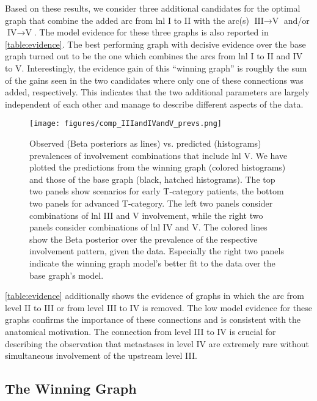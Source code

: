 \documentclass[twocolumn]{article}
\begin{document}
Based on these results, we consider three additional candidates for the optimal graph that combine the added arc from \gls{lnl} I to II with the arc(s) $\text{III} \rightarrow \text{V}$ and/or $\text{IV} \rightarrow \text{V}$. The model evidence for these three graphs is also reported in \cref{table:evidence}. The best performing graph with decisive evidence over the base graph turned out to be the one which combines the arcs from \gls{lnl} I to II and IV to V. Interestingly, the evidence gain of this ``winning graph'' is roughly the sum of the gains seen in the two candidates where only one of these connections was added, respectively. This indicates that the two additional parameters are largely independent of each other and manage to describe different aspects of the data.

\begin{figure*}
    \begin{centering}
        \texttt{[image: figures/comp\_IIIandIVandV\_prevs.png]}
        \caption{Observed (Beta posteriors as lines) vs. predicted (histograms) prevalences of involvement combinations that include \gls{lnl} V. We have plotted the predictions from the winning graph (colored histograms) and those of the base graph (black, hatched histograms). The top two panels show scenarios for early T-category patients, the bottom two panels for advanced T-category. The left two panels consider combinations of \gls{lnl} III and V involvement, while the right two panels consider combinations of \gls{lnl} IV and V. The colored lines show the Beta posterior over the prevalence of the respective involvement pattern, given the data. Especially the right two panels indicate the winning graph model's better fit to the data over the base graph's model. \label{fig:IIIandIVandV_prevs}}
    \end{centering}
\end{figure*}

\cref{table:evidence} additionally shows the evidence of graphs in which the arc from level II to III or from level III to IV is removed. The low model evidence for these graphs confirms the importance of these connections and is consistent with the anatomical motivation. The connection from level III to IV is crucial for describing the observation that metastases in level IV are extremely rare without simultaneous involvement of the upstream level III. 


\subsection{The Winning Graph}
\label{subsec:results:optimal_graph}
\end{document}
